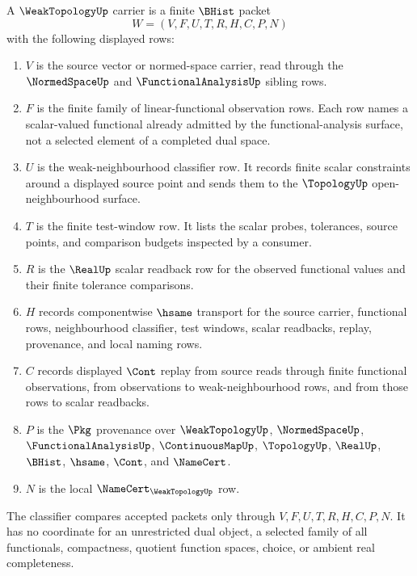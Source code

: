 \begin{definition}
\label{def:weak-topology-carrier}
A $\WeakTopologyUp$ carrier is a finite $\BHist$ packet
$$
W=(V,F,U,T,R,H,C,P,N)
$$
with the following displayed rows:
\begin{enumerate}
\item $V$ is the source vector or normed-space carrier, read through the $\NormedSpaceUp$ and $\FunctionalAnalysisUp$ sibling rows.
\item $F$ is the finite family of linear-functional observation rows. Each row names a scalar-valued functional already admitted by the functional-analysis surface, not a selected element of a completed dual space.
\item $U$ is the weak-neighbourhood classifier row. It records finite scalar constraints around a displayed source point and sends them to the $\TopologyUp$ open-neighbourhood surface.
\item $T$ is the finite test-window row. It lists the scalar probes, tolerances, source points, and comparison budgets inspected by a consumer.
\item $R$ is the $\RealUp$ scalar readback row for the observed functional values and their finite tolerance comparisons.
\item $H$ records componentwise $\hsame$ transport for the source carrier, functional rows, neighbourhood classifier, test windows, scalar readbacks, replay, provenance, and local naming rows.
\item $C$ records displayed $\Cont$ replay from source reads through finite functional observations, from observations to weak-neighbourhood rows, and from those rows to scalar readbacks.
\item $P$ is the $\Pkg$ provenance over $\WeakTopologyUp$, $\NormedSpaceUp$, $\FunctionalAnalysisUp$, $\ContinuousMapUp$, $\TopologyUp$, $\RealUp$, $\BHist$, $\hsame$, $\Cont$, and $\NameCert$.
\item $N$ is the local $\NameCert_{\WeakTopologyUp}$ row.
\end{enumerate}
The classifier compares accepted packets only through $V,F,U,T,R,H,C,P,N$. It has no coordinate for an unrestricted dual object, a selected family of all functionals, compactness, quotient function spaces, choice, or ambient real completeness.
\end{definition}

